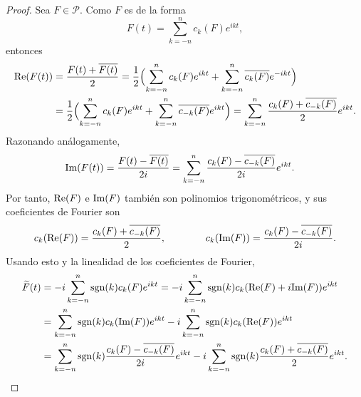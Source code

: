 \documentclass[a4paper, 12pt, oneside]{book}
\begin{document}
\begin{proof}
    Sea $F \in \mathcal{P}$. Como $F$ es de la forma
    \[F(t) = \sum_{k=-n}^n c_k(F)e^{ikt},\]
    entonces
    \begin{align*}
        \textup{Re}(F(t)) &= \frac{F(t)+\overline{F(t)}}{2} = \frac{1}{2}\Bigl(\sum_{k=-n}^n c_k(F)e^{ikt}+\sum_{k=-n}^n\overline{c_k(F)}e^{-ikt}\Bigr) \\
        &= \frac{1}{2}\Bigl(\sum_{k=-n}^n c_k(F)e^{ikt}+\sum_{k=-n}^n\overline{c_{-k}(F)}e^{ikt}\Bigr) = \sum_{k=-n}^n \frac{c_k(F)+\overline{c_{-k}(F)}}{2}e^{ikt}.
    \end{align*}
    Razonando análogamente,
    \begin{align*}
        \textup{Im}(F(t)) &= \frac{F(t)-\overline{F(t)}}{2i} = \sum_{k=-n}^n \frac{c_k(F)-\overline{c_{-k}(F)}}{2i}e^{ikt}.
    \end{align*}
    Por tanto, $\textup{Re}(F)$ e $\textup{Im}(F)$ también son polinomios trigonométricos, y sus coeficientes de Fourier son
    \[c_k(\textup{Re}(F)) = \frac{c_k(F)+\overline{c_{-k}(F)}}{2}, \qquad \qquad c_k(\textup{Im}(F)) = \frac{c_k(F)-\overline{c_{-k}(F)}}{2i}.\]
    Usando esto y la linealidad de los coeficientes de Fourier,
    \begin{equation}\label{3.2.3}
    \begin{aligned}[b]
        \widetilde{F}(t) &= -i\sum_{k=-n}^n \textup{sgn}(k)c_k(F)e^{ikt} = -i\sum_{k=-n}^n \textup{sgn}(k)c_k(\textup{Re}(F)+i\textup{Im}(F))e^{ikt} \\
        &= \sum_{k=-n}^n \textup{sgn}(k)c_k(\textup{Im}(F))e^{ikt} -i\sum_{k=-n}^n \textup{sgn}(k)c_k(\textup{Re}(F))e^{ikt} \\
        &=  \sum_{k=-n}^n \textup{sgn}(k)\frac{c_k(F)-\overline{c_{-k}(F)}}{2i}e^{ikt} -i\sum_{k=-n}^n \textup{sgn}(k)\frac{c_k(F)+\overline{c_{-k}(F)}}{2}e^{ikt}.
     \end{aligned}
    \end{equation}
    

\end{proof}
\end{document}
